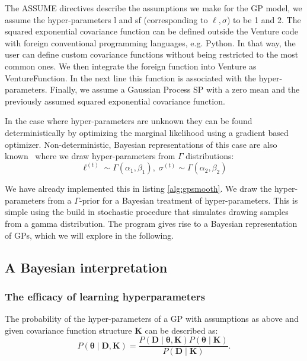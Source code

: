 \documentclass{article} %
\begin{document}
The ASSUME directives describe the assumptions we make for the GP model, we assume the hyper-parameters l and sf (corresponding to $\ell,\sigma$) to be 1 and 2. The squared exponential covariance function can be defined outside the Venture code with foreign conventional programming languages, e.g. Python. In that way, the user can define custom covariance functions without being restricted to the most common ones. We then integrate the foreign function into Venture as VentureFunction. In the next line this function is associated with the hyper-parameters. Finally, we assume a Gaussian Process SP with a zero mean and the previously assumed squared exponential covariance function.





In the case where hyper-parameters are unknown they can be found deterministically by optimizing the marginal likelihood using a gradient based optimizer. Non-deterministic, Bayesian representations of this case are also known~\citep{neal1997monte} where we draw hyper-parameters from $\Gamma$ distributions:
\begin{equation}
\ell^{(t)} \sim \Gamma(\alpha_1,\beta_1),\;\sigma^{(t)} \sim \Gamma(\alpha_2,\beta_2)
\end{equation}

We have already implemented this in listing \ref{alg:gpsmooth}. We draw the hyper-parameters from a $\Gamma$-prior for a Bayesian treatment of hyper-parameters. This is simple using the build in stochastic procedure that simulates drawing samples from a gamma distribution.
The program gives rise to a Bayesian representation of GPs, which we will explore in the following.

\subsection{A Bayesian interpretation}
\subsubsection{The efficacy of learning hyperparameters}
The probability of the hyper-parameters of a GP with assumptions as above and given covariance function structure $\mathbf{K}$ can be described as:
\begin{equation}
\label{eq:hyperProbability}
P(\bm{\theta} \mid \mathbf{D,K}) = \frac{P(\mathbf{D} \mid \bm{\theta}, \mathbf{K})P(\bm{\theta} \mid  \mathbf{K})}{P(\mathbf{D} \mid \mathbf{K})}.
\end{equation}
\end{document}
